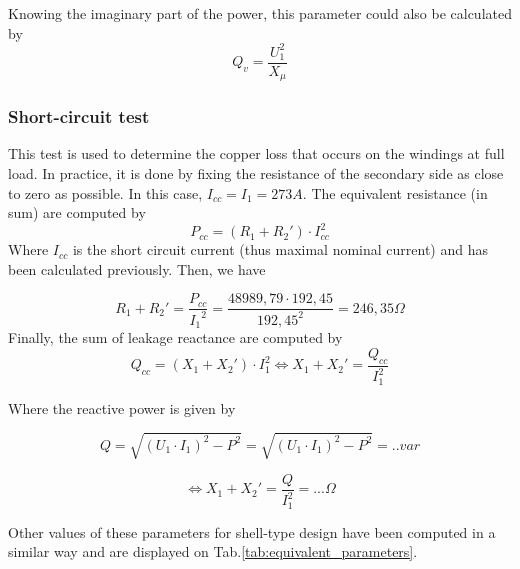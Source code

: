 \documentclass[12pt,a4paper]{report}
\begin{document}
Knowing the imaginary part of the power, this parameter could also be calculated by 
\begin{equation}
   Q_v = \frac{U_1^2}{X_{\mu}}
\end{equation}

\subsubsection{Short-circuit test}
This test is used to determine the copper loss that occurs on the windings at full load. In practice, it is done by fixing the resistance of the secondary side as close to zero as possible. In this case, $I_{cc} = I_1 = 273 A$. The equivalent resistance (in sum) are computed by
\begin{equation}
P_{cc} = (R_1 + R_2') \cdot I_{cc}^2
\end{equation}
Where $I_{cc}$ is the short circuit current (thus maximal nominal current) and has been calculated previously. Then, we have

\begin{equation}
    R_1 + R_2' = \frac{P_{cc}}{{I_1}^2} = \frac{48989,79 \cdot 192,45}{192,45^2} = 246,35 \Omega
\end{equation}
Finally, the sum of leakage reactance are computed by
\begin{equation}
Q_{cc} = (X_1 + X_2') \cdot I_1^2 \iff X_1 + X_2' = \frac{Q_{cc}}{I_1^2}
\end{equation}

Where the reactive power is given by

\begin{equation}
    Q = \sqrt{(U_1 \cdot I_1)^2-P^2} = \sqrt{(U_1 \cdot I_1)^2-P^2} = .. var
\end{equation}

\begin{equation}
    \iff X_1 + X_2' = \frac{Q}{I_1^2} = ... \Omega
\end{equation}

Other values of these parameters for shell-type design have been computed in a similar way and are displayed on Tab.\ref{tab:equivalent_parameters}.
\end{document}
